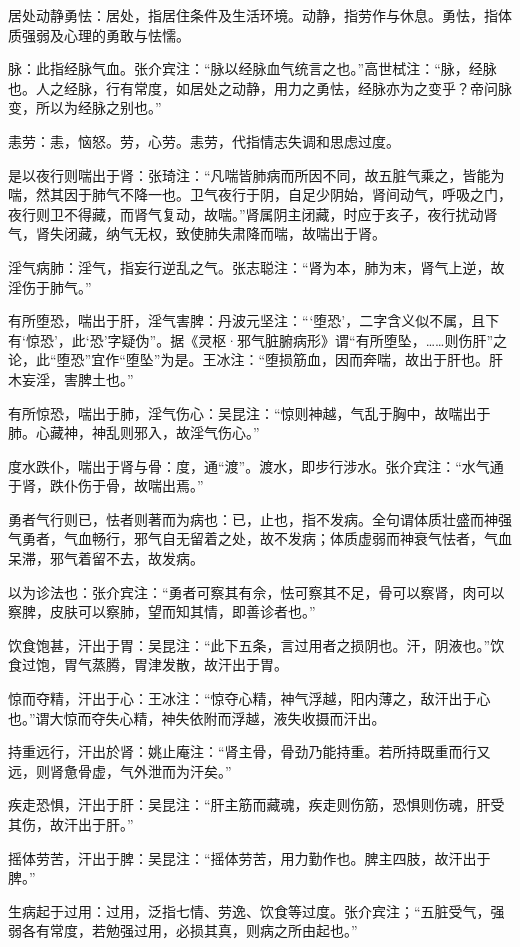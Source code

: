 \documentclass[12pt]{ctexbook}
\begin{document}
\begin{jiaozhu}
	\item 居处动静勇怯：居处，指居住条件及生活环境。动静，指劳作与休息。勇怯，指体质强弱及心理的勇敢与怯懦。
	\item 脉：此指经脉气血。张介宾注：“脉以经脉血气统言之也。”高世栻注：“脉，经脉也。人之经脉，行有常度，如居处之动静，用力之勇怯，经脉亦为之变乎？帝问脉变，所以为经脉之别也。”
	\item 恚劳：恚，恼怒。劳，心劳。恚劳，代指情志失调和思虑过度。
	\item 是以夜行则喘出于肾：张琦注：“凡喘皆肺病而所因不同，故五脏气乘之，皆能为喘，然其因于肺气不降一也。卫气夜行于阴，自足少阴始，肾间动气，呼吸之门，夜行则卫不得藏，而肾气复动，故喘。”肾属阴主闭藏，时应于亥子，夜行扰动肾气，肾失闭藏，纳气无权，致使肺失肃降而喘，故喘出于肾。
	\item 淫气病肺：淫气，指妄行逆乱之气。张志聪注：“肾为本，肺为末，肾气上逆，故淫伤于肺气。”
	\item 有所堕恐，喘出于肝，淫气害脾：丹波元坚注：“‘堕恐’，二字含义似不属，且下有‘惊恐'，此‘恐’字疑伪”。据《灵枢·邪气脏腑病形》谓“有所堕坠，……则伤肝”之论，此“堕恐”宜作“堕坠”为是。王冰注：“堕损筋血，因而奔喘，故出于肝也。肝木妄淫，害脾土也。”
	\item 有所惊恐，喘出于肺，淫气伤心：吴昆注：“惊则神越，气乱于胸中，故喘出于肺。心藏神，神乱则邪入，故淫气伤心。”
	\item 度水跌仆，喘出于肾与骨：度，通“渡”。渡水，即步行涉水。张介宾注：“水气通于肾，跌仆伤于骨，故喘出焉。”
	\item 勇者气行则已，怯者则著而为病也：已，止也，指不发病。全句谓体质壮盛而神强气勇者，气血畅行，邪气自无留着之处，故不发病；体质虚弱而神衰气怯者，气血呆滞，邪气着留不去，故发病。
	\item 以为诊法也：张介宾注：“勇者可察其有佘，怯可察其不足，骨可以察肾，肉可以察脾，皮肤可以察肺，望而知其情，即善诊者也。”
	\item 饮食饱甚，汗出于胃：吴昆注：“此下五条，言过用者之损阴也。汗，阴液也。”饮食过饱，胃气蒸腾，胃津发散，故汗出于胃。
	\item 惊而夺精，汗出于心：王冰注：“惊夺心精，神气浮越，阳内薄之，敌汗出于心也。”谓大惊而夺失心精，神失依附而浮越，液失收摄而汗出。
	\item 持重远行，汗出於肾：姚止庵注：“肾主骨，骨劲乃能持重。若所持既重而行又远，则肾惫骨虚，气外泄而为汗矣。”
	\item 疾走恐惧，汗出于肝：吴昆注：“肝主筋而藏魂，疾走则伤筋，恐惧则伤魂，肝受其伤，故汗出于肝。”
	\item 摇体劳苦，汗出于脾：吴昆注：“摇体劳苦，用力勤作也。脾主四肢，故汗出于脾。”
	\item 生病起于过用：过用，泛指七情、劳逸、饮食等过度。张介宾注；“五脏受气，强弱各有常度，若勉强过用，必损其真，则病之所由起也。”
\end{jiaozhu}
\end{document}
